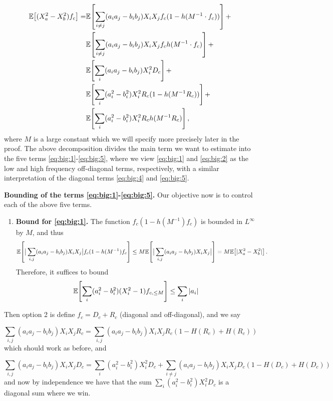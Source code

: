 \documentclass{inprogress}
\begin{document}
\begin{subequations}\label{eq:big}
\begin{align}
   \mathbb E \!\left[(X_a^2-X_b^2) f_c\right] \label{eq:big:1}
    = & 
    \mathbb E \!\left[\sum_{i\neq j} (a_ia_j-b_ib_j) X_iX_j f_c (1-h(M^{-1}\cdot f_c))\right] +
    \\  & 
    \mathbb E \!\left[\sum_{i\neq j} (a_ia_j-b_ib_j) X_iX_j f_c h(M^{-1}\cdot f_c)\right] +\label{eq:big:2}
    \\  & 
    \mathbb E \!\left[\sum_{i} (a_ia_j-b_ib_j) X_i^2 D_c \right] +\label{eq:big:3}
    \\  & 
    \mathbb E \!\left[\sum_{i} (a_i^2-b_i^2) X_i^2 R_c (1-h(M^{-1}R_c)) \right] +\label{eq:big:4}
    \\  & 
    \mathbb E \!\left[\sum_{i} (a_i^2-b_i^2) X_i^2 R_c h(M^{-1}R_c) \right],\label{eq:big:5}
\end{align}
\end{subequations}
where $M$ is a large constant which we will specify more precisely later in the proof. The above decomposition divides the main term we want to estimate into the five terms \eqref{eq:big:1}-\eqref{eq:big:5}, where we view \eqref{eq:big:1} and \eqref{eq:big:2} as the low and high frequency off-diagonal terms, respectively, with a similar interpretation of the diagonal terms \eqref{eq:big:4} and \eqref{eq:big:5}.
\medskip

\textbf{Bounding of the terms  \eqref{eq:big:1}-\eqref{eq:big:5}.} Our objective now is to control each of the above five terms.

\begin{enumerate}
    \item \textbf{Bound for \eqref{eq:big:1}.} The function $f_c(1-h(M^{-1})f_c)$ is bounded in $L^\infty$ by $M$, and thus
    $$
    \mathbb E \!\left[\big|\sum_{i,j} (a_{i}a_j-b_ib_j) X_iX_j\big|f_c(1-h(M^{-1})f_c\right] \le M
    \mathbb E \!\left[\big|\sum_{i,j} (a_{i}a_j-b_ib_j) X_iX_j\big|\right] =  M \mathbb E \!\left[|X_a^2-X_b^2|\right].
    $$
    Therefore, it suffices to bound
    $$
    \mathbb E \!\left[\sum_{i} (a_{i}^2-b_i^2) (X_i^2-1) f_{c,\le M}\right]
    \le \sum_i |a_i|
    $$
\end{enumerate}
Then option 2 is define $f_c = D_c +R_c$ (diagonal and off-diagonal), and we say

$$
\sum_{i,j} (a_ia_j -b_ib_j) X_iX_jR_c =
\sum_{i,j} (a_ia_j -b_ib_j) X_iX_jR_c (1-H(R_c)+H(R_c)) 
$$
which should work as before, and

$$
\sum_{i,j} (a_ia_j -b_ib_j) X_iX_jD_c =
\sum_i (a_i^2-b_i^2) X_i^2 D_c +
\sum_{i\neq j} (a_ia_j -b_ib_j) X_iX_jD_c (1-H(D_c)+H(D_c)) 
$$
and now by independence we have that the sum $\sum_i (a_i^2-b_i^2) X_i^2 D_c$ is a diagonal sum where we win.
\end{document}
